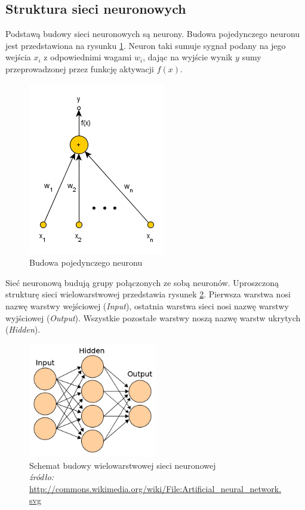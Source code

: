 \subsection{Struktura sieci neuronowych}
Podstawą budowy sieci neuronowych są neurony. Budowa pojedynczego neuronu jest przedstawiona na rysunku \ref{fig:neuron}. Neuron taki sumuje sygnał podany na jego wejścia $x_i$ z odpowiednimi wagami $w_i$, dając na wyjście wynik $y$ sumy przeprowadzonej przez funkcję aktywacji $f(x)$.
\begin{figure}[ht!]
	\centering
	\includegraphics[scale=0.8]{images/single_neuron.png}
	\caption{Budowa pojedynczego neuronu}
	\label{fig:neuron}
\end{figure}

Sieć neuronową budują grupy połączonych ze sobą neuronów. Uproszczoną strukturę sieci wielowarstwowej przedstawia rysunek \ref{fig:multilayer}. Pierwsza warstwa nosi nazwę warstwy wejściowej (\textit{Input}), ostatnia warstwa sieci nosi nazwę warstwy wyjściowej (\textit{Output}). Wszystkie pozostałe warstwy noszą nazwę warstw ukrytych (\textit{Hidden}).

\begin{figure}
	\centering
	\includegraphics[width=0.5\textwidth]{images/560px-Artificial_neural_network.png}
	\caption{Schemat budowy wielowarstwowej sieci neuronowej \\
	\footnotesize{\textit{źródło:} \url{http://commons.wikimedia.org/wiki/File:Artificial\_neural\_network.svg}} }
	\label{fig:multilayer}
\end{figure}


